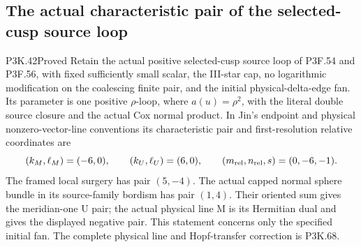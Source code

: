 \subsection{The actual characteristic pair of the selected-cusp source loop}
\begin{statement}{P3K.42}{Proved}
Retain the actual positive selected-cusp source loop of P3F.54 and
P3F.56, with fixed sufficiently small scalar, the III-star cap, no
logarithmic modification on the coalescing finite pair, and the
initial physical-delta-edge fan. Its parameter is one positive
\(\rho\)-loop, where \(a(u)=\rho^2\), with the literal double
source closure and the actual Cox normal product. In Jin's endpoint
and physical nonzero-vector-line conventions its characteristic pair and
first-resolution relative coordinates are
\[
       (k_M,\ell_M)=(-6,0),\qquad(k_U,\ell_U)=(6,0),\qquad
       (m_{\rm rel},n_{\rm rel},s)=(0,-6,-1).
\]
The framed local surgery has pair \((5,-4)\). The actual capped
normal sphere bundle in its source-family bordism has pair
\((1,4)\). Their oriented sum gives the meridian-one U pair; the actual physical line M is its Hermitian dual and gives the displayed negative pair.
This statement concerns only the specified initial fan. The complete physical line and Hopf-transfer correction is P3K.68.
\end{statement}
